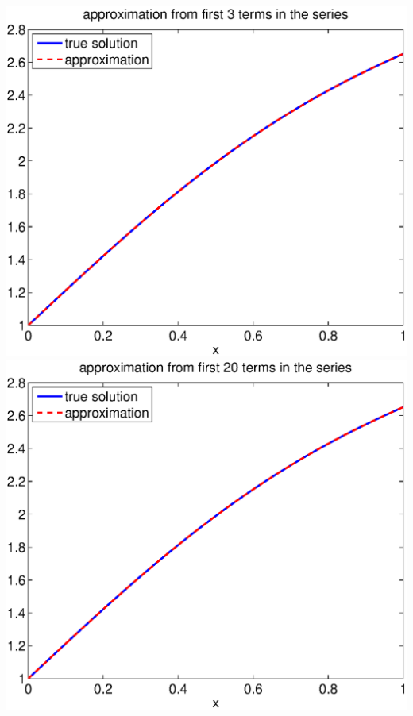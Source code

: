 \begin{solution}
\begin{enumerate}
\begin{center}
   \includegraphics[scale=0.4]{bvpsin_3}\quad
   \includegraphics[scale=0.4]{bvpsin_20}
\end{center}



\end{enumerate}
\end{solution}